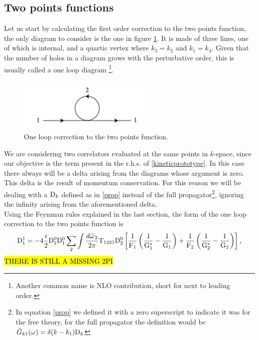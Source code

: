 \subsection{Two points functions}
Let us start by calculating the first order correction to the two points function, the only diagram to consider is the one in figure \ref{fig:oneloop2}. It is made 
of three lines, one of which is internal, and a quartic vertex where $k_3 = k_2$ and $k_1 = k_4$. Given that the number of holes in a diagram grows with the perturbative order, this is usually called a one loop diagram
\footnote{Another common name is NLO contribution, short for next to leading order.}.\\
\begin{figure}[ht]
    \centering
    \includegraphics[width=0.6\textwidth]{images/2pointsoneloop.jpg}
    \caption{One loop correction to the two points function.}
    \label{fig:oneloop2}
\end{figure}
We are considering two correlators evaluated at the same points in $k$-space, since our objective is the term present in the r.h.s. of \eqref{kineticprototype}. 
In this case there always will be a delta arising from the diagrams whose argument is zero. This delta is the result of momentum conservation.
For this reason we will be dealing with a $\mathrm{D}_k$ defined as in \eqref{prop} instead of the full propagator\footnote{In equation \eqref{prop} we defined it 
with a zero superscript to indicate it was for the free theory, for the full propagator the definition would be $\tilde{G}_{k1}(\omega^{})=\delta(k-k_1)\mathrm{D}_k$},
ignoring the infinity arising from the aforementioned delta. \\
Using the Feynman rules explained in the last section, the form of the one loop correction to the two points function is
\begin{equation}
    \mathrm{D}_1^{1} = -4\frac{i}{2} \mathrm{D}^0_1\mathrm{D}^0_1 \sum_{2} \int \frac{d\tilde{\omega^{}}_2}{2\pi} \mathrm{T}_{1221}\mathrm{D}^0_2\left[\frac{1}{\mathrm{F}_1}\left( \frac{1}{\mathrm{G}_1^*} - \frac{1}{\mathrm{G}_1}\right) +
    \frac{1}{\mathrm{F}_2}\left( \frac{1}{\mathrm{G}_2^*} - \frac{1}{\mathrm{G}_2}\right) 
    \right],
\end{equation}
\hl{THERE IS STILL A MISSING 2PI}\\

